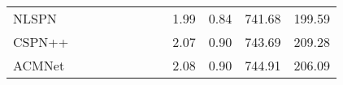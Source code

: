 \documentclass[letterpaper, 10 pt, conference]{ieeeconf}  \usepackage{geometry}
\begin{document}
\begin{table*}[t]
{\begin{tabular}{@{}lccccccccccc@{}}
			\multicolumn{1}{l|}{NLSPN \cite{NL_spatialprop}}                            & \multicolumn{1}{c|}{\checkmark}                                                        & \multicolumn{1}{c|}{\checkmark}                                                              & \multicolumn{1}{c|}{}                                                            & \multicolumn{1}{c|}{\checkmark}              & \multicolumn{1}{c|}{\checkmark}              & \multicolumn{1}{c|}{}                                                                 & \multicolumn{1}{c|}{}                                                                   & 1.99                                                                                 & 0.84                                                                                & 741.68                                                                            & 199.59                                                      \\
			\multicolumn{1}{l|}{CSPN++ \cite{CSPN++}}                           & \multicolumn{1}{c|}{\checkmark}                                                        & \multicolumn{1}{c|}{\checkmark}                                                              & \multicolumn{1}{c|}{}                                                            & \multicolumn{1}{c|}{\checkmark}              & \multicolumn{1}{c|}{\checkmark}              & \multicolumn{1}{c|}{}                                                                 & \multicolumn{1}{c|}{}                                                                   & 2.07                                                                                 & 0.90                                                                                & 743.69                                                                            & 209.28                                                      \\
			\multicolumn{1}{l|}{ACMNet \cite{GraphConv}}                           & \multicolumn{1}{c|}{\checkmark}                                                        & \multicolumn{1}{c|}{\checkmark}                                                              & \multicolumn{1}{c|}{}                                                            & \multicolumn{1}{c|}{\checkmark}              & \multicolumn{1}{c|}{}                 & \multicolumn{1}{c|}{}                                                                 & \multicolumn{1}{c|}{}                                                                   & 2.08                                                                                 & 0.90                                                                                & 744.91                                                                            & 206.09                                                      \\

\end{tabular}}
\end{table*}
\end{document}
